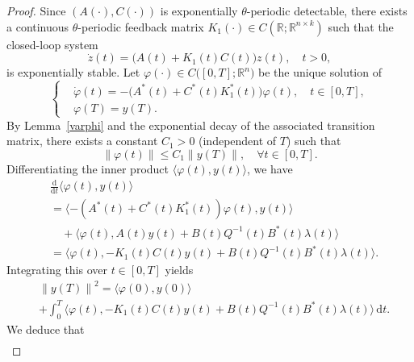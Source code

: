 \documentclass{IEEEtran}
\begin{document}
	\begin{proof}
		Since $(A(\cdot),C(\cdot))$ is exponentially $\theta$-periodic detectable, 
		there exists a continuous $\theta$-periodic feedback matrix $K_1(\cdot)\in C(\mathbb R;\mathbb R^{n\times k})$ such that the closed-loop system
		\begin{equation}
			\dot z(t)=\big(A(t)+K_1(t)C(t)\big)z(t),\quad t>0,
		\end{equation}is exponentially stable.
		Let $\varphi(\cdot) \in C\big([0,T]; \mathbb{R}^n\big)$ be the unique solution of 
		\begin{equation*}
			\left\{
			\begin{aligned}
				&\dot{\varphi}(t)=-\big(A^*(t)+C^*(t) K^*_1(t)\big) \varphi(t), \quad t \in[0, T], \\
				&\varphi(T)=y(T).
			\end{aligned}
			\right.
		\end{equation*}
		By Lemma~\ref{varphi} and the exponential decay of the associated transition matrix, 
		there exists a constant $C_1 > 0$ (independent of $T$) such that
		\begin{equation}
			\|\varphi (t)\| \leq C_1 \|y(T)\|,\quad \forall t\in [0,T].
		\end{equation}
		Differentiating the inner product $\langle \varphi(t), y(t)\rangle$, we have
		\begin{equation*}
			\begin{split}
				&\frac{\mathrm{d}}{\mathrm{d}t}\langle \varphi(t), y(t)\rangle \\&= \langle-(A^*(t)+C^*(t) K^*_1(t)) \varphi(t), y(t)\rangle \\
				&\quad + \langle \varphi(t), A(t) y(t)+B(t)Q^{-1}(t)B^*(t)\lambda(t)\rangle\\
				&= \langle \varphi(t), -K_1(t)C(t) y(t)+B(t)Q^{-1}(t)B^*(t)\lambda(t)\rangle.
			\end{split}
		\end{equation*}
		Integrating this over $t \in [0,T]$ yields
		\begin{equation*}
			\begin{split}
				&\left\|y(T) \right\| ^2=\langle \varphi(0), y(0)\rangle\\
				&+\int_0^T \langle \varphi(t), -K_1(t)C(t) y(t)
				+B(t)Q^{-1}(t)B^*(t)\lambda(t)\rangle  \,\mathrm{d}t.
			\end{split}
		\end{equation*} 
		We deduce that
		\begin{equation*}
			\begin{split}

\end{split}
\end{equation*}
\end{proof}
\end{document}
